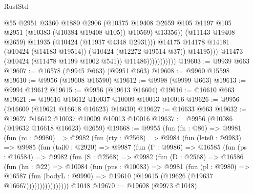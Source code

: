 \begin{lexlean}{RustStd}
\begin{coremodule}
                                      @55
                                      @2951
                                      @3360
                                      @1880
                                      @2906
                                      (@10375
                                        @19408
                                        @2659
                                        @105
                                        @1197
                                        @105
                                        @2951
                                        (@10383 (@10384 @19408 @105))
                                        @10569)
                                      @13356))
                                  (@11143 @19408 @2659)
                                  @11935
                                  (@10424 (@11937 @4348 @2931)))
                                @14175
                                @14178
                                @14181
                                (@10424 (@14183 @19514))
                                (@10424 (@12272 @19514 @37))
                                @14195)))
                          @11473
                          (@10424 (@11478 @1199 @1002 @541))
                          @11486)))))))))))
@19603 := @9939 @663
@19607 := @16578 (@9945 @663) (@9951 @663)
@19608 := @9960 @15598
@19610 := @9956 (@19608 @16590)
@19612 := @9998 (@9999 @663)
@19613 := @9994 @19612
@19615 := @9956 (@19613 @16604)
@19616 := @16610 @663
@19621 := @19616 @16612 @10037 @10009 @10013 @10016
@19626 := @9956 (@16609 (@19621 @16618 @16623) @16630)
@19627 := @16633 @663
@19632 := @19627 @16612 @10037 @10009 @10013 @10016
@19637 := @9956 (@10086 (@19632 @16618 @16623) @2659)
@19668 := @9955
    (fun (fn : @86) =>
    @9981
      (fun (rc : @9980) =>
      @9982
        (fun (rty : @2568) =>
        @9984
          (fun (lets0 : @9983) =>
          @9985
            (fun (tail0 : @2920) =>
            @9987
              (fun (Γ : @9986) =>
              @16585
                (fun (ps : @16584) =>
                @9982
                  (fun (S : @2568) =>
                  @9982
                    (fun (D : @2568) =>
                    @16586
                      (fun (hn : @22) =>
                      @10084
                        (fun (pns : @10083) =>
                        @9981
                          (fun (pl : @9980) =>
                          @16587
                            (fun (bodyL : @9990) =>
                            @19610 (@19615 (@19626 (@19637 @16667))))))))))))))))
    @1048
@19670 := @19608 (@9973 @1048)

\end{coremodule}
\end{lexlean}
